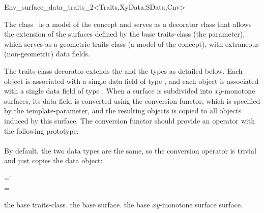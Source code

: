 
\ccRefPageBegin
\begin{ccRefClass}{Env_surface_data_traits_2<Traits,XyData,SData,Cnv>}

\ccDefinition

The class \ccRefName\ is a model of the  concept
and serves as a decorator class that allows the extension of the surfaces
defined by the base traits-class (the  parameter), which serves
as a geometric traits-class (a model of the  concept),
with extraneous (non-geometric) data fields.

The traits-class decorator extends the  and the
 types as detailed below.
Each  object is associated with a single data field of type
, and each  object is associated with
a single data field of type . When a surface is
subdivided into $xy$-monotone surfaces, its data field is converted using
the conversion functor, which is specified by the  template-parameter,
and the resulting objects is copied to all  objects
induced by this surface. The conversion functor should provide an operator with
the following prototype: \\
\indent {} \\

By default, the two data types are the same, so the conversion operator
is trivial and just copies the data object:
\begin{tabbing}
 = \=\\
 = \>
\end{tabbing}

 
\ccIsModel

\ccTypes

    {the base traits-class.}
\ccGlue
{}
    {the base surface.}
\ccGlue
{}
    {the base $xy$-monotone surface surface.}


\end{ccRefClass}
